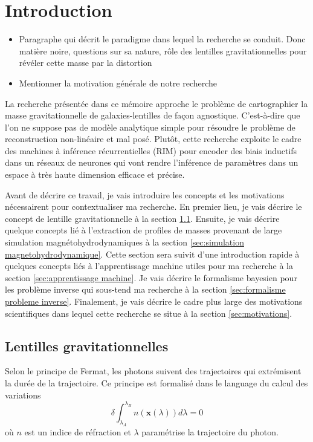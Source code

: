 \chapter{Introduction}
\thispagestyle{empty}
\begin{itemize}
        \item Paragraphe qui décrit le paradigme dans lequel la recherche se conduit. 
                Donc matière noire, questions sur sa nature, rôle des 
                lentilles gravitationnelles pour révéler cette masse par la distortion
        \item Mentionner la motivation générale de notre recherche
\end{itemize}

La recherche présentée dans ce mémoire approche le problème de cartographier la 
masse gravitationnelle de galaxies-lentilles de façon agnostique. C'est-à-dire que 
l'on ne suppose pas de modèle analytique simple pour résoudre le problème 
de reconstruction non-linéaire et mal posé. Plutôt, cette recherche exploite 
le cadre des machines à inférence récurrentielles (RIM) pour encoder des biais 
inductifs dans un réseaux de neurones qui vont rendre l'inférence de 
paramètres dans un espace à très haute dimension efficace et précise.

Avant de décrire ce travail, je vais introduire les concepts 
et les motivations nécessairent pour contextualiser ma recherche.
En premier lieu, je vais décrire le concept de lentille 
gravitationnelle à la section \ref{sec:lentilles gravitationnelles}. Ensuite, 
je vais décrire quelque concepts lié à l'extraction de profiles de masses 
provenant de large simulation magnétohydrodynamiques à la section 
\ref{sec:simulation magnetohydrodynamique}. 
Cette section sera suivit d'une introduction rapide à quelques concepts liés 
à l'apprentissage machine utiles pour ma recherche
à la section \ref{sec:apprentissage machine}. 
Je vais décrire le formalisme bayesien pour les problème inverse 
qui sous-tend ma recherche à la section \ref{sec:formalisme probleme inverse}.
Finalement, je vais décrire le cadre plus large des motivations scientifiques 
dans lequel cette recherche se situe à la section \ref{sec:motivations}.


\section{Lentilles gravitationnelles}\label{sec:lentilles gravitationnelles}
Selon le principe de Fermat, les photons suivent des trajectoires qui extrémisent 
la durée de la trajectoire. Ce principe est formalisé dans le language du calcul 
des variations
\begin{equation}\label{eq:Fermat}
        \delta \int_{\lambda_A}^{\lambda_B} n(\mathbf{x}(\lambda))d\lambda = 0 
\end{equation} 
où $n$ est un indice de réfraction et $\lambda$ paramétrise la trajectoire du photon.

